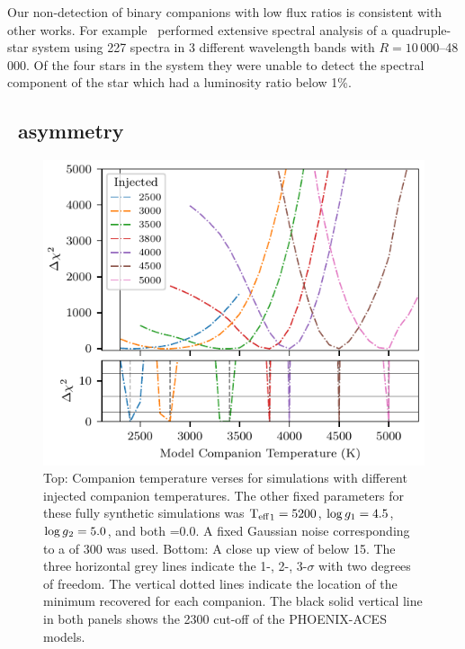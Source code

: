 Our non-detection of binary companions with low flux ratios is consistent with other works.
For example~\citet{nemravova_xtauri_2016} performed extensive spectral analysis of a quadruple-star system  using 227 spectra in 3 different wavelength bands with \(R=10\,000\)--48\,000.
Of the four stars in the system they were unable to detect the spectral component of the star which had a luminosity ratio below 1\%.



\subsection{\texorpdfstring{\textchisquared}{Chi-squared}\ asymmetry}
\label{subsec:chi2_assymetry}

\begin{figure}
    \centering
    \includegraphics[width=0.8\linewidth]{figures/companion_recovery/chi2_shape_investigation_with_delta}
    \caption[Shape of simulated \textchisquared{} with different injected companion temperatures.]{Top: Companion temperature verses \textchisquared{} for simulations with different injected companion temperatures.
        The other fixed parameters for these fully synthetic simulations was \({\textrm{T}_{\mathrm{eff}}}_{1}=5200\)\K{}, \(\log{g}_{1}=4.5\), \(\log{g}{}_{2}=5.0\), and both \feh{}=0.0.
        A fixed Gaussian noise corresponding to a \snr{} of 300 was used.
        Bottom: A close up view of \textchisquared{} below 15.
        The three horizontal grey lines indicate the 1-, 2-, 3-$\sigma$ with two degrees of freedom.
        The vertical dotted lines indicate the location of the minimum \textchisquared{} recovered for each companion.
        The black solid vertical line in both panels shows the 2300\K{} cut-off of the {PHOENIX-ACES} models.}
    \label{fig:injection_shape}
\end{figure}

